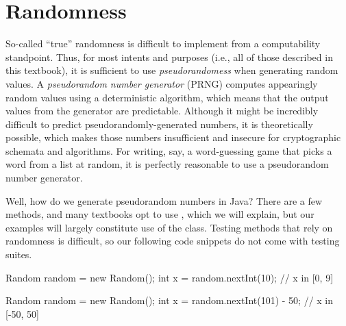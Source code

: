 \section{Randomness}
So-called ``true'' randomness is difficult to implement from a computability standpoint. 
Thus, for most intents and purposes (i.e., all of those described in this textbook), it is sufficient to use \emph{pseudorandomess} when generating random values. 
A \emph{pseudorandom number generator} (PRNG) computes appearingly random values using a deterministic algorithm, which means that the output values from the generator are predictable. 
Although it might be incredibly difficult to predict pseudorandomly-generated numbers, it is theoretically possible, which makes those numbers insufficient and insecure for cryptographic schemata and algorithms. For writing, say, a word-guessing game that picks a word from a list at random, it is perfectly reasonable to use a pseudorandom number generator.

Well, how do we generate pseudorandom numbers in Java? There are a few methods, and many textbooks opt to use , which we will explain, but our examples will largely constitute use of the  class. Testing methods that rely on randomness is difficult, so our following code snippets do not come with testing suites. 


\begin{verbnobox}[\small]
Random random = new Random();
int x = random.nextInt(10); // x in [0, 9]
\end{verbnobox}

\begin{verbnobox}[\small]
Random random = new Random();
int x = random.nextInt(101) - 50; // x in [-50, 50]
\end{verbnobox}

